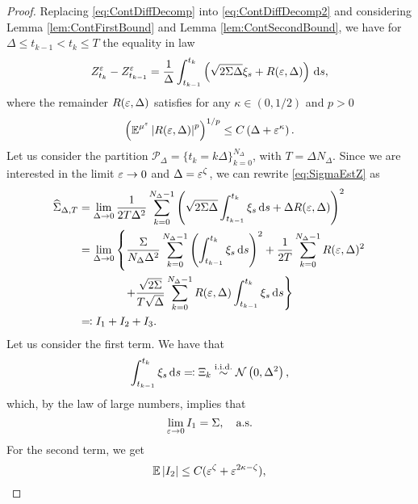 \documentclass[10pt]{article}
\begin{document}
\begin{proof} Replacing \eqref{eq:ContDiffDecomp} into \eqref{eq:ContDiffDecomp2} and considering Lemma \ref{lem:ContFirstBound} and Lemma \ref{lem:ContSecondBound}, we have for $ \Delta \leq t_{k-1} < t_k \leq T$ the equality in law
	\begin{equation}
		Z^\varepsilon_{t_k} - Z^\varepsilon_{t_{k-1}} = \frac1\Delta \int_{t_{k-1}}^{t_k} \left(\sqrt{2\Sigma\Delta} \xi_s + R(\varepsilon, \Delta)\right)\,\mathrm{d} s,
	\end{equation}
	where the remainder $R(\varepsilon, \Delta)$ satisfies for any $\kappa \in (0, 1/2)$ and $p > 0$
	\begin{equation}
		\left(\operatorname{\mathbb{E}}^{\mu^\varepsilon}\left\lvert R(\varepsilon, \Delta)\right\rvert^p\right)^{1/p} \leq C\left(\Delta + \varepsilon^\kappa\right).
	\end{equation}
	Let us consider the partition $\mathcal P_\Delta = \{t_k = k\Delta\}_{k=0}^{N_\Delta}$, with $T = \Delta N_\Delta$. Since we are interested in the limit $\varepsilon \to 0$ and $\Delta = \varepsilon^\zeta$, we can rewrite \eqref{eq:SigmaEstZ} as
	\begin{equation}
	\begin{aligned}
		\widehat \Sigma_{\Delta, T} &= \lim_{\Delta\to 0} \frac1{2T\Delta^2}  \sum_{k=0}^{N_\Delta-1}\left( \sqrt{2\Sigma\Delta} \int_{t_{k-1}}^{t_k} \xi_s \,\mathrm{d} s + \Delta R(\varepsilon, \Delta)\right)^2 \\
		&= \lim_{\Delta\to 0} \left\{\frac{\Sigma}{N_\Delta\Delta^2} \sum_{k=0}^{N_\Delta-1} \left( \int_{t_{k-1}}^{t_k} \xi_s \,\mathrm{d} s\right)^2 
		+ \frac1{2T} \sum_{k=0}^{N_\Delta-1} R(\varepsilon, \Delta)^2 \right.\\
		&\qquad \qquad \left. + \frac{\sqrt{2\Sigma}}{T\sqrt{\Delta}} \sum_{k=0}^{N_\Delta-1} R(\varepsilon, \Delta) \int_{t_{k-1}}^{t_k} \xi_s \,\mathrm{d} s \right\} \\
		&\eqqcolon I_1 + I_2 + I_3.
	\end{aligned}
	\end{equation}
	Let us consider the first term. We have that 
	\begin{equation}		
		\int_{t_{k-1}}^{t_k} \xi_s \,\mathrm{d} s \eqqcolon \Xi_k \stackrel{\text{i.i.d.}}{\sim} \mathcal N\left(0, \Delta^2\right),
	\end{equation}
	which, by the law of large numbers, implies that
	\begin{equation}
		\lim_{\varepsilon \to 0} I_1 = \Sigma, \quad \text{a.s.}
	\end{equation}
	For the second term, we get
	\begin{equation}
		\operatorname{\mathbb{E}}\left\lvert I_2\right\rvert \leq C (\varepsilon^{\zeta} + \varepsilon^{2\kappa - \zeta}),
	\end{equation}

\end{proof}
\end{document}
